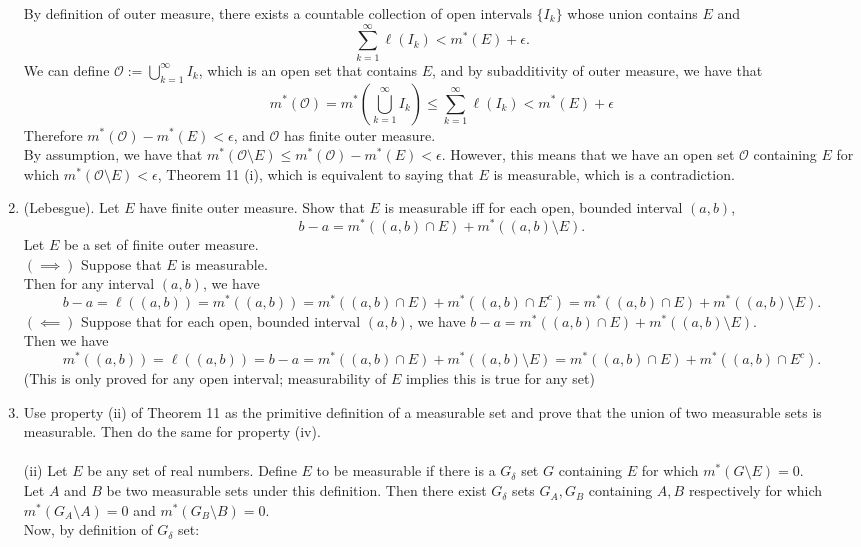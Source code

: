 \begin{enumerate}
	By definition of outer measure, there exists a countable collection of open intervals $\{I_k\}$ whose union contains $E$ and 
	\[
		\sum_{k=1}^\infty \ell(I_k)<m^*(E)+\epsilon.
	\]
	We can define $\mathcal{O}:=\bigcup_{k=1}^\infty I_k$, which is an open set that contains $E$, and by subadditivity of outer measure, we have that
	\[
		m^*(\mathcal{O})=m^*(\bigcup_{k=1}^\infty I_k)\le\sum_{k=1}^\infty \ell(I_k)<m^*(E)+\epsilon
	\]
	Therefore $m^*(\mathcal{O})-m^*(E)<\epsilon$, and $\mathcal{O}$ has finite outer measure.\\
	By assumption, we have that $m^*(\mathcal{O}\setminus E) \le m^*(\mathcal{O})-m^*(E)<\epsilon$.
	However, this means that we have an open set $\mathcal{O}$ containing $E$ for which $m^*(\mathcal{O}\setminus E) <\epsilon$, Theorem 11 (i), which is equivalent to saying that $E$ is measurable, which is a contradiction.
	\item (Lebesgue). Let $E$ have finite outer measure. Show that $E$ is measurable iff for each open, bounded interval $(a,b)$,
	\[
		b-a=m^*((a,b)\cap E)+m^*((a,b)\setminus E).
	\]
	Let $E$ be a set of finite outer measure.\\
	$(\implies)$ Suppose that $E$ is measurable.\\
	Then for any interval $(a,b)$, we have 
	\[
		b-a=\ell((a,b))=m^*((a,b))=m^*((a,b)\cap E)+m^*((a,b)\cap E^c)=m^*((a,b)\cap E)+m^*((a,b)\setminus E).
	\]
	$(\impliedby)$ Suppose that for each open, bounded interval $(a,b)$, we have $b-a=m^*((a,b)\cap E)+m^*((a,b)\setminus E)$.\\
	Then we have
	\[
		m^*((a,b))=\ell((a,b))=b-a=m^*((a,b)\cap E)+m^*((a,b)\setminus E)=m^*((a,b)\cap E)+m^*((a,b)\cap E^c).
	\]
	(This is only proved for any open interval; measurability of $E$ implies this is true for any set)
	\item Use property (ii) of Theorem 11 as the primitive definition of a measurable set and prove that the union of two measurable sets is measurable. Then do the same for property (iv).\\
	\\(ii) Let $E$ be any set of real numbers. Define $E$ to be measurable if there is a $G_\delta$ set $G$ containing $E$ for which $m^*(G\setminus E)=0$.\\
	Let $A$ and $B$ be two measurable sets under this definition.
	Then there exist $G_\delta$ sets $G_A,G_B$ containing $A,B$ respectively for which $m^*(G_A\setminus A)=0$ and $m^*(G_B\setminus B)=0$.\\
	Now, by definition of $G_\delta$ set:

\end{enumerate}
